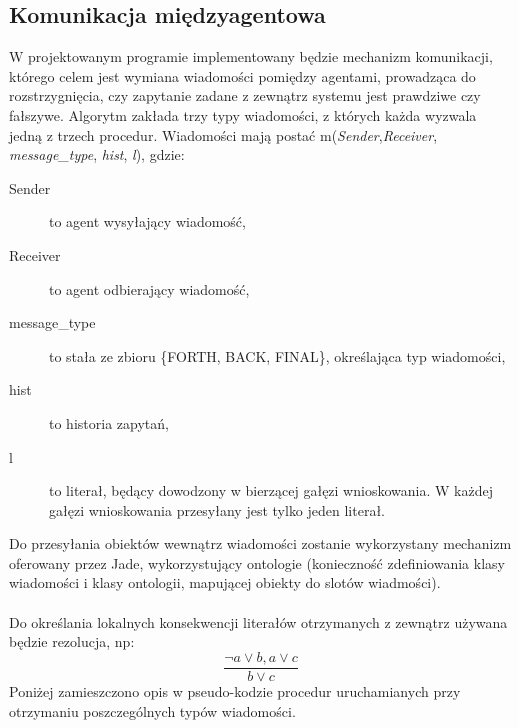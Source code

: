 \documentclass[a4paper,12pt]{mwart}
\begin{document}
\subsection{Komunikacja międzyagentowa}
W projektowanym programie implementowany będzie mechanizm komunikacji, którego celem jest wymiana wiadomości pomiędzy agentami, prowadząca do rozstrzygnięcia, czy zapytanie zadane z zewnątrz systemu jest prawdziwe czy fałszywe.
Algorytm zakłada trzy typy wiadomości, z których każda wyzwala jedną z trzech procedur. Wiadomości mają postać m(\textit{Sender},\textit{Receiver}, \textit{message\_type}, \textit{hist}, \textit{l}), gdzie:
\begin{description}
\item[Sender] to agent wysyłający wiadomość,
\item[Receiver] to agent odbierający wiadomość,
\item[message\_type] to stała ze zbioru \{FORTH, BACK, FINAL\}, określająca typ wiadomości,
\item[hist] to historia zapytań,
\item[l] to literał, będący dowodzony w bierzącej gałęzi wnioskowania. W każdej gałęzi wnioskowania przesyłany jest tylko jeden literał.
\end{description}
Do przesyłania obiektów wewnątrz wiadomości zostanie wykorzystany mechanizm oferowany przez Jade, wykorzystujący ontologie (konieczność zdefiniowania klasy wiadomości i klasy ontologii, mapującej obiekty do slotów wiadmości). 
\\\\
Do określania lokalnych konsekwencji literałów otrzymanych z zewnątrz używana będzie rezolucja, np:
\begin{equation}
\frac{\neg a \vee b, a \vee c}{b \vee c}
\end{equation}
Poniżej zamieszczono opis w pseudo-kodzie procedur uruchamianych przy otrzymaniu poszczególnych typów wiadomości.
\end{document}

